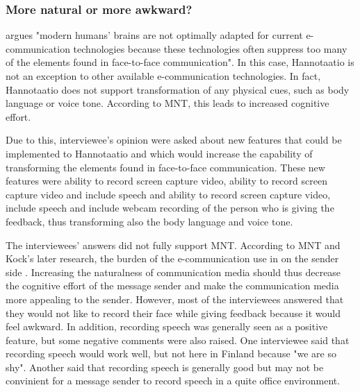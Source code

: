 \documentclass[english,12pt,a4paper,pdftex]{article}
\begin{document}
\subsubsection{More natural or more awkward?}

\citet{kock2005} argues "modern humans' brains are not optimally adapted for current e-communication technologies because these technologies often suppress too many of the elements found in face-to-face communication". In this case, Hannotaatio is not an exception to other available e-communication technologies. In fact, Hannotaatio does not support transformation of any physical cues, such as body language or voice tone. According to \ac{MNT}, this leads to increased cognitive effort.

Due to this, interviewee's opinion were asked about new features that could be implemented to Hannotaatio and which would increase the capability of transforming the elements found in face-to-face communication. These new features were ability to record screen capture video, ability to record screen capture video and include speech and ability to record screen capture video, include speech and include webcam recording of the person who is giving the feedback, thus transforming also the body language and voice tone.

The interviewees' answers did not fully support \ac{MNT}. According to \ac{MNT} and Kock's later research, the burden of the e-communication use in on the sender side \citep{kock2007}. Increasing the naturalness of communication media should thus decrease the cognitive effort of the message sender and make the communication media more appealing to the sender. However, most of the interviewees answered that they would not like to record their face while giving feedback because it would feel awkward. In addition, recording speech was generally seen as a positive feature, but some negative comments were also raised. One interviewee said that recording speech would work well, but not here in Finland because "we are so shy". Another said that recording speech is generally good but may not be convinient for a message sender to record speech in a quite office environment.

\end{document}
